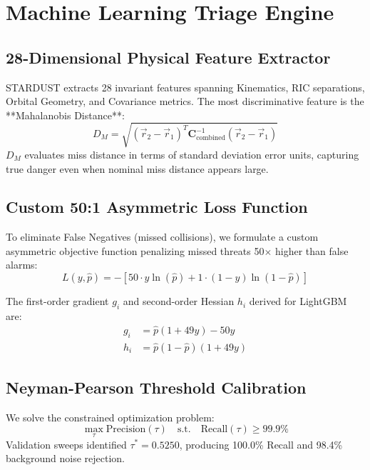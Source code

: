 \documentclass[10pt,twocolumn,a4paper]{article}
\begin{document}
\section{Machine Learning Triage Engine}

\subsection{28-Dimensional Physical Feature Extractor}
STARDUST extracts 28 invariant features spanning Kinematics, RIC separations, Orbital Geometry, and Covariance metrics. The most discriminative feature is the **Mahalanobis Distance**:
\begin{equation}
D_M = \sqrt{(\vec{r}_2 - \vec{r}_1)^T \mathbf{C}_{\text{combined}}^{-1} (\vec{r}_2 - \vec{r}_1)}
\end{equation}
$D_M$ evaluates miss distance in terms of standard deviation error units, capturing true danger even when nominal miss distance appears large.

\subsection{Custom 50:1 Asymmetric Loss Function}
To eliminate False Negatives (missed collisions), we formulate a custom asymmetric objective function penalizing missed threats 50$\times$ higher than false alarms:
\begin{equation}
L(y, \hat{p}) = -\left[ 50 \cdot y \ln(\hat{p}) + 1 \cdot (1-y) \ln(1-\hat{p}) \right]
\end{equation}

The first-order gradient $g_i$ and second-order Hessian $h_i$ derived for LightGBM are:
\begin{align}
g_i &= \hat{p}(1 + 49y) - 50y \\
h_i &= \hat{p}(1 - \hat{p})(1 + 49y)
\end{align}

\subsection{Neyman-Pearson Threshold Calibration}
We solve the constrained optimization problem:
\begin{equation}
\max_{\tau} \text{Precision}(\tau) \quad \text{s.t.} \quad \text{Recall}(\tau) \ge 99.9\%
\end{equation}
Validation sweeps identified $\tau^* = 0.5250$, producing 100.0\% Recall and 98.4\% background noise rejection.
\end{document}
